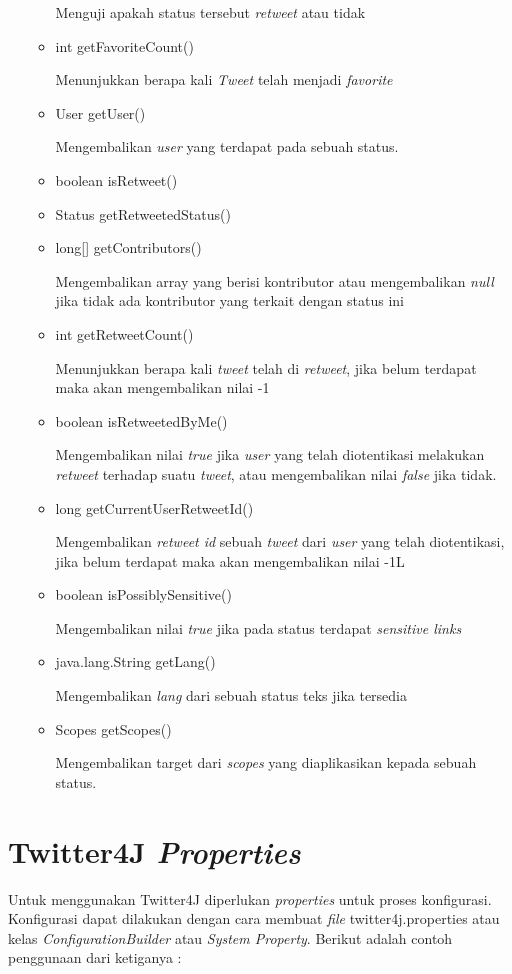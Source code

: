 \begin{itemize}
\begin{itemize}
			Menguji apakah status tersebut \textit{retweet} atau tidak
			\item int getFavoriteCount()
			
			Menunjukkan berapa kali \textit{Tweet} telah menjadi \textit{favorite}
			\item User getUser()
			
			Mengembalikan \textit{user} yang terdapat pada sebuah status.
			\item boolean isRetweet()
			\item Status getRetweetedStatus()
			\item long[] getContributors()
			
			Mengembalikan array yang berisi kontributor atau mengembalikan \textit{null} jika tidak ada kontributor yang terkait dengan status ini
			\item int getRetweetCount()
			
			Menunjukkan berapa kali \textit{tweet} telah di \textit{retweet}, jika belum terdapat maka akan mengembalikan nilai -1
			\item boolean isRetweetedByMe()
			
			Mengembalikan nilai \textit{true} jika \textit{user} yang telah diotentikasi melakukan \textit{retweet} terhadap suatu \textit{tweet}, atau mengembalikan nilai \textit{false} jika tidak.
			\item long getCurrentUserRetweetId()
			
			Mengembalikan \textit{retweet id} sebuah \textit{tweet} dari \textit{user} yang telah diotentikasi, jika belum terdapat maka akan mengembalikan nilai -1L
			\item boolean isPossiblySensitive()
			
			Mengembalikan nilai \textit{true} jika pada status terdapat \textit{sensitive links}
			\item java.lang.String getLang()
			
			Mengembalikan \textit{lang} dari sebuah status teks jika tersedia
			\item Scopes getScopes()
			
			Mengembalikan target dari \textit{scopes} yang diaplikasikan kepada sebuah status.
		\end{itemize}
	\end{itemize}
	
	\section{Twitter4J \textit{Properties}}
	Untuk menggunakan Twitter4J diperlukan \textit{properties} untuk proses konfigurasi. Konfigurasi dapat dilakukan dengan cara membuat \textit{file} twitter4j.properties atau kelas \textit{ConfigurationBuilder} atau \textit{System Property}. Berikut adalah contoh penggunaan dari ketiganya :

